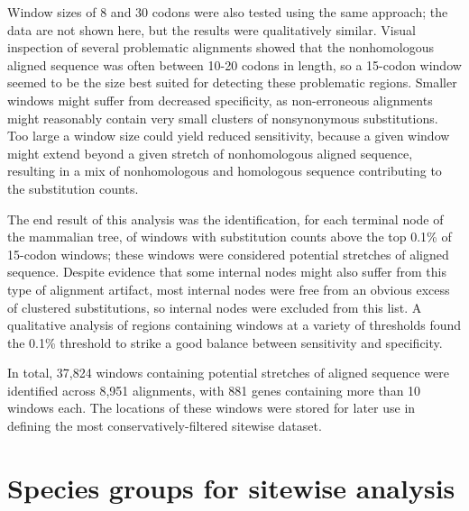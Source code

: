 
Window sizes of 8 and 30 codons were also tested using the same
approach; the data are not shown here, but the results were
qualitatively similar. Visual inspection of several problematic
alignments showed that the nonhomologous aligned sequence was often
between 10-20 codons in length, so a 15-codon window seemed to be the
size best suited for detecting these problematic regions. Smaller
windows might suffer from decreased specificity, as non-erroneous
alignments might reasonably contain very small clusters of
nonsynonymous substitutions. Too large a window size could yield
reduced sensitivity, because a given window might extend beyond a
given stretch of nonhomologous aligned sequence, resulting in a mix of
nonhomologous and homologous sequence contributing to the substitution
counts.



The end result of this analysis was the identification, for each
terminal node of the mammalian tree, of windows with \nsyn
substitution counts above the top 0.1\% of 15-codon windows; these
windows were considered potential stretches of \nhom aligned
sequence. Despite evidence that some internal nodes might also suffer
from this type of alignment artifact, most internal nodes were free
from an obvious excess of clustered \nsyn substitutions, so internal
nodes were excluded from this list. A qualitative analysis of regions
containing windows at a variety of thresholds found the 0.1\%
threshold to strike a good balance between sensitivity and
specificity.

In total, 37,824 windows containing potential stretches of \nhom
aligned sequence were identified across 8,951 alignments, with 881
genes containing more than 10 windows each. The locations of these
windows were stored for later use in defining the most
conservatively-filtered sitewise dataset.


\section{Species groups for sitewise analysis}

